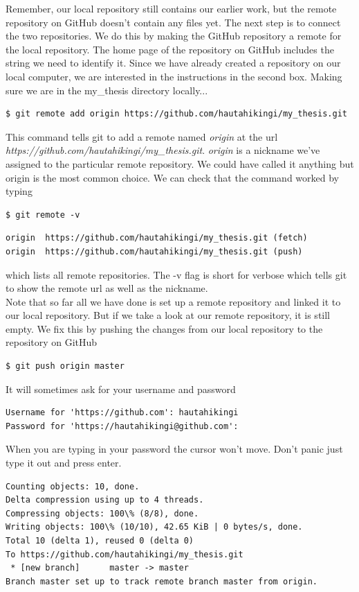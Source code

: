 \documentclass{article}
\begin{document}
Remember, our local repository still contains our earlier work, but the remote repository on GitHub doesn't contain any files yet. The next step is to connect the two repositories. We do this by making the GitHub repository a remote for the local repository. The home page of the repository on GitHub includes the string we need to identify it. Since we have already created a repository on our local computer, we are interested in the instructions in the second box. Making sure we are in the my\_thesis directory locally...
\begin{lstlisting}[frame=single]
$ git remote add origin https://github.com/hautahikingi/my_thesis.git
\end{lstlisting}
This command tells git to add a remote named \emph{origin} at the url \emph{https://github.com/hautahikingi/my\_thesis.git}. \emph{origin} is a nickname we've assigned to the particular remote repository. We could have called it anything but origin is the most common choice. We can check that the command worked by typing
\begin{lstlisting}[frame=single]
$ git remote -v
\end{lstlisting}
\begin{lstlisting}[frame=single]
origin	https://github.com/hautahikingi/my_thesis.git (fetch)
origin	https://github.com/hautahikingi/my_thesis.git (push)
\end{lstlisting}

which lists all remote repositories. The -v flag is short for verbose which tells git to show the remote url as well as the nickname.\\

Note that so far all we have done is set up a remote repository and linked it to our local repository. But if we take a look at our remote repository, it is still empty. We fix this by pushing the changes from our local repository to the repository on GitHub
\begin{lstlisting}
$ git push origin master
\end{lstlisting}
It will sometimes ask for your username and password
\begin{lstlisting}[frame=single]
Username for 'https://github.com': hautahikingi
Password for 'https://hautahikingi@github.com':
\end{lstlisting}
When you are typing in your password the cursor won't move. Don't panic just type it out and press enter.
\begin{lstlisting}[frame=single]
Counting objects: 10, done.
Delta compression using up to 4 threads.
Compressing objects: 100\% (8/8), done.
Writing objects: 100\% (10/10), 42.65 KiB | 0 bytes/s, done.
Total 10 (delta 1), reused 0 (delta 0)
To https://github.com/hautahikingi/my_thesis.git
 * [new branch]      master -> master
Branch master set up to track remote branch master from origin.
\end{lstlisting}
\end{document}
